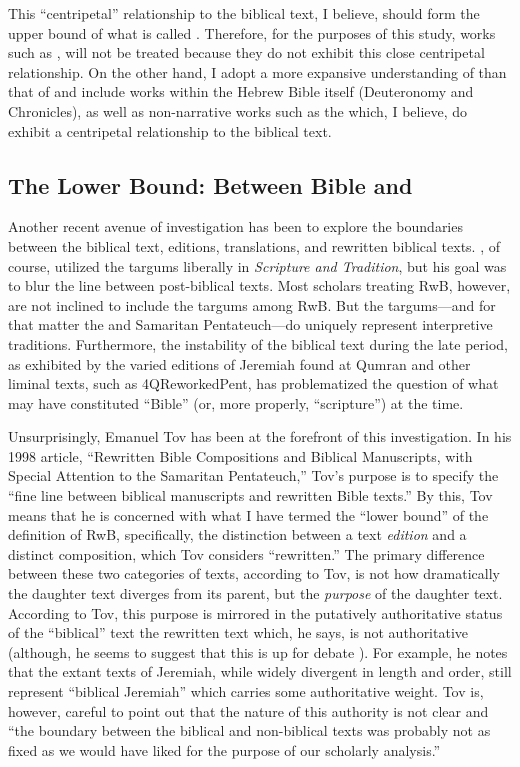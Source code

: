 This ``centripetal'' relationship to the biblical text, I believe, should form the upper bound of what is called \rwb. Therefore, for the purposes of this study, works such as \firstenoch, will not be treated because they do not exhibit this close centripetal relationship. On the other hand, I adopt a more expansive understanding of \rwb than that of \vermes and include works within the Hebrew Bible itself (Deuteronomy and Chronicles), as well as non-narrative works such as the \templescroll which, I believe, do exhibit a centripetal relationship to the biblical text. 


\subsection{The Lower Bound: Between Bible and \RWB}

Another recent avenue of investigation has been to explore the boundaries between the biblical text, editions, translations, and rewritten biblical texts. \vermes, of course, utilized the targums liberally in \emph{Scripture and Tradition}, but his goal was to blur the line between post-biblical texts. Most scholars treating RwB, however, are not inclined to include the targums among RwB. But the targums---and for that matter the \lxx and Samaritan Pentateuch---do uniquely represent interpretive traditions. Furthermore, the instability of the biblical text during the late \secondtemple period, as exhibited by the varied editions of Jeremiah found at Qumran and other liminal texts, such as 4QReworkedPent, has problematized the question of what may have constituted ``Bible'' (or, more properly, ``scripture'') at the time. 

Unsurprisingly, Emanuel Tov has been at the forefront of this investigation. In his 1998 article, ``Rewritten Bible Compositions and Biblical Manuscripts, with Special Attention to the Samaritan Pentateuch,'' Tov's purpose is to specify the ``fine line between biblical manuscripts and rewritten Bible texts.''%
    \autocite[334]{tov_dsd1998}
By this, Tov means that he is concerned with what I have termed the ``lower bound'' of the definition of RwB, specifically, the distinction between a text \emph{edition} and a distinct composition, which Tov considers ``rewritten.'' The primary difference between these two categories of texts, according to Tov, is not how dramatically the daughter text diverges from its parent, but the \emph{purpose} of the daughter text.%
    \autocite[334]{tov_dsd1998}
According to Tov, this purpose is mirrored in the putatively authoritative status of the ``biblical'' text \visavis the rewritten text which, he says, is not authoritative (although, he seems to suggest that this is up for debate%
    \autocite[337]{tov_dsd1998}
). For example, he notes that the extant texts of Jeremiah, while widely divergent in length and order, still represent ``biblical Jeremiah'' which carries some authoritative weight. Tov is, however, careful to point out that the nature of this authority is not clear and ``the boundary between the biblical and non-biblical texts was probably not as fixed as we would have liked for the purpose of our scholarly analysis.''%
    \autocite[335]{tov_dsd1998} 

